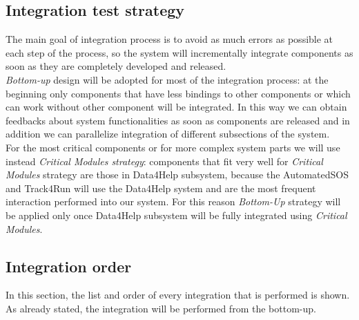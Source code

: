 \documentclass[a4paper, hidelinks, 12pt]{report}
\begin{document}
\subsection{Integration test strategy}  
The main goal of integration process is to avoid as much errors as possible at each step of the process, so the system will incrementally integrate components as soon as they are completely developed and released.\\

\textit{Bottom-up} design will be adopted for most of the integration process: at the beginning only components that have less bindings to other components or which can work without other component will be integrated. In this way we can obtain feedbacks about system functionalities as soon as components are released and in addition we can parallelize integration of different subsections of the system.\\

For the most critical components or for more complex system parts we will use instead \textit{Critical Modules strategy}: components that fit very well for \textit{Critical Modules} strategy are those in Data4Help subsystem, because the AutomatedSOS and Track4Run will use the Data4Help system and are the most frequent interaction performed into our system. For this reason \textit{Bottom-Up} strategy will be applied only once Data4Help subsystem will be fully integrated using \textit{Critical Modules}.

\subsection{Integration order}
In this section, the list and order of every integration that is performed is shown. As already stated, the integration will be performed from the bottom-up. \\
\end{document}
